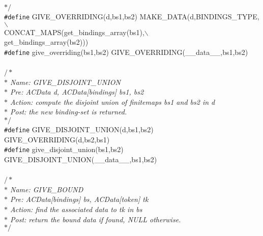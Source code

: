 \begin{flushleft}
{\hspace*{1\indentation}$\ast/$}\mbox{}\\
{\tt \#define} GIVE\_OVERRIDING(d,bs1,bs2) MAKE\_DATA(d,BINDINGS\_TYPE,$\backslash$\\
\hspace*{35\indentation}CONCAT\_MAPS(get\_bindings\_array(bs1),$\backslash$\\
\hspace*{47\indentation}get\_bindings\_array(bs2)))\mbox{}\\
{\tt \#define} give\_overriding(bs1,bs2) GIVE\_OVERRIDING(\_\_data\_\_,bs1,bs2)\mbox{}\\
\mbox{}\\
{$/\ast$\it{}\mbox{}\\
\hspace*{1\indentation}$\ast$ Name: GIVE\_DISJOINT\_UNION\mbox{}\\
\hspace*{1\indentation}$\ast$ Pre: ACData d, ACData[bindings] bs1, bs2\mbox{}\\
\hspace*{1\indentation}$\ast$ Action: compute the disjoint union of finitemaps bs1 and bs2 in d\mbox{}\\
\hspace*{1\indentation}$\ast$ Post: the new binding-set is returned.\mbox{}\\
\hspace*{1\indentation}$\ast/$}\mbox{}\\
{\tt \#define} GIVE\_DISJOINT\_UNION(d,bs1,bs2) GIVE\_OVERRIDING(d,bs2,bs1)\mbox{}\\
{\tt \#define} give\_disjoint\_union(bs1,bs2) GIVE\_DISJOINT\_UNION(\_\_data\_\_,bs1,bs2)\mbox{}\\
\mbox{}\\
{$/\ast$\it{}\mbox{}\\
\hspace*{1\indentation}$\ast$ Name: GIVE\_BOUND\mbox{}\\
\hspace*{1\indentation}$\ast$ Pre: ACData[bindings] bs, ACData[token] tk\mbox{}\\
\hspace*{1\indentation}$\ast$ Action: find the associated data to tk in bs\mbox{}\\
\hspace*{1\indentation}$\ast$ Post: return the bound data if found, NULL otherwise.\mbox{}\\
\hspace*{1\indentation}$\ast/$}\mbox{}\\

\end{flushleft}

